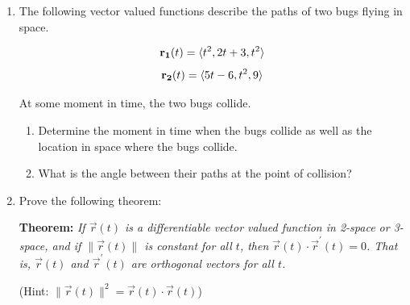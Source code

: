 \documentclass[12pt]{article}
\newif\ifans
\begin{document}
\begin{enumerate}
\item The following vector valued functions describe the paths of two bugs flying in space.  

$${\bf r_1}(t)=\langle t^2, 2t+3, t^2\rangle$$
$${\bf r_2}(t)=\langle 5t-6, t^2, 9\rangle$$

At some moment in time, the two bugs collide.

\begin{enumerate}

\item Determine the moment in time when the bugs collide as well as the location in space where the bugs collide.

\ifans{\fbox{\parbox{1\linewidth}{The bugs intersect when $t=3$.  This corresponds to the point $(x,y,z)=(9,9,9)$. Detailed Solution: \textcolor{blue}{\href{http://www.math.drexel.edu/classes/Calculus/resources/Math200HW/Solutions/08_200_Vector_Functions_08.pdf}{Here}}}}} \fi

\item What is the angle between their paths at the point of collision?

\ifans{\fbox{$\cos^{-1}\left(\frac{42}{\sqrt{76}\sqrt{61}}\right)$; Detailed Solution: \textcolor{blue}{\href{http://www.math.drexel.edu/classes/Calculus/resources/Math200HW/Solutions/08_200_Vector_Functions_08.pdf}{Here}}}} \fi

\end{enumerate}

\item Prove the following theorem:

{\bf Theorem:} \emph{If $\overrightarrow{r}(t)$ is a differentiable vector valued function in 2-space or 3-space, and if $\|\overrightarrow{r}(t)\|$ is constant for all $t$, then $\overrightarrow{r}(t)\cdot\overrightarrow{r}^{\prime}(t)=0$.  That is, $\overrightarrow{r}(t)$ and $\overrightarrow{r}^{\prime}(t)$ are orthogonal vectors for all $t$.}

(Hint: $\|\overrightarrow{r}(t)\|^2=\overrightarrow{r}(t)\cdot\overrightarrow{r}(t)$)

\ifans{\fbox{\parbox{1\linewidth}{Suppose $\|\overrightarrow{r}(t)\|=k$, where $k$ is constant.  Then:
\begin{align*}
\|\overrightarrow{r}(t)\|^2&=k^2\\
\overrightarrow{r}(t)\cdot\overrightarrow{r}(t)&=k^2\\
\frac{d}{dt}\left[\overrightarrow{r}(t)\cdot\overrightarrow{r}(t)\right]&=\frac{d}{dt}\left(k^2\right)\\
\overrightarrow{r}(t)\cdot \overrightarrow{r}^{\prime}(t)+\overrightarrow{r}^{\prime}(t)\cdot \overrightarrow{r}(t)&=0\\
2\left[\overrightarrow{r}(t)\cdot \overrightarrow{r}^{\prime}(t)\right]&=0\\
\overrightarrow{r}(t)\cdot \overrightarrow{r}^{\prime}(t)&=0
\end{align*}
And, the result is proven.
}}} \fi


\end{enumerate}
\end{document}
